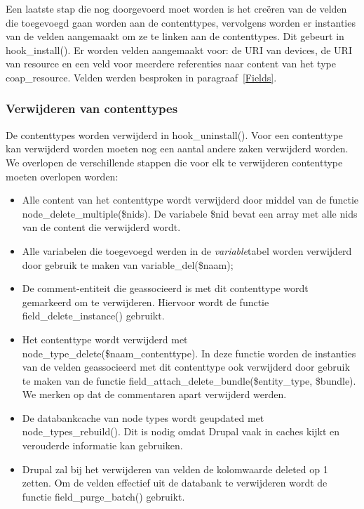 \noindent
Een laatste stap die nog doorgevoerd moet worden is het cre\"{e}ren van de velden die toegevoegd gaan worden aan de contenttypes, vervolgens worden er instanties van de velden aangemaakt om ze te linken aan de contenttypes. Dit gebeurt in hook\_install(). Er worden velden aangemaakt voor: de URI van devices, de URI van resource en een veld voor meerdere referenties naar content van het type coap\_resource. Velden werden besproken in paragraaf~\ref{Fields}.

\subsubsection{Verwijderen van contenttypes}
De contenttypes worden verwijderd in hook\_uninstall(). Voor een contenttype kan verwijderd worden moeten nog een aantal andere zaken verwijderd worden. We overlopen de verschillende stappen die voor elk te verwijderen contenttype moeten overlopen worden:
\begin{itemize}
\item Alle content van het contenttype wordt verwijderd door middel van de functie\\ node\_delete\_multiple(\$nids). De variabele \$nid bevat een array met alle nids van de content die verwijderd wordt.
\item Alle variabelen die toegevoegd werden in de \textit{variable}tabel worden verwijderd door gebruik te maken van variable\_del(\$naam);
\item De comment-entiteit die geassocieerd is met dit contenttype wordt gemarkeerd om te verwijderen. Hiervoor wordt de functie field\_delete\_instance() gebruikt.
\item Het contenttype wordt verwijderd met node\_type\_delete(\$naam\_contenttype). In deze functie worden de instanties van de velden geassocieerd met dit contenttype ook verwijderd door gebruik te maken van de functie field\_attach\_delete\_bundle(\$entity\_type, \$bundle). We merken op dat de commentaren apart verwijderd werden.
\item De databankcache van node types wordt geupdated met node\_types\_rebuild(). Dit is nodig omdat Drupal vaak in caches kijkt en verouderde informatie kan gebruiken.
\item Drupal zal bij het verwijderen van velden de kolomwaarde deleted op 1 zetten. Om de velden effectief uit de databank te verwijderen wordt de functie field\_purge\_batch() gebruikt.
\end{itemize}

